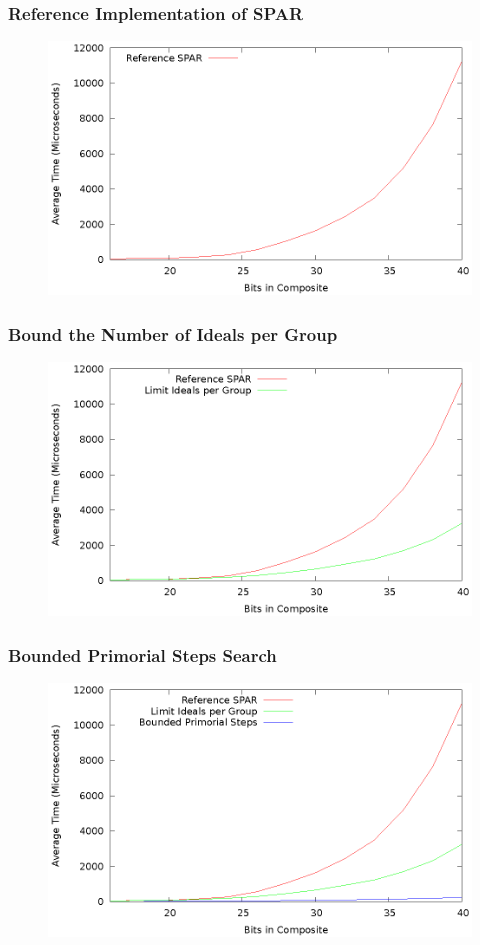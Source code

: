 \documentclass{beamer}
\begin{document}
\begin{frame}
\frametitle{Reference Implementation of SPAR}
\begin{figure}
\includegraphics[scale=0.86]{spar-vanilla}
\end{figure}
\end{frame}
\begin{frame}
\frametitle{Bound the Number of Ideals per Group}
\begin{figure}
\includegraphics[scale=0.86]{spar-bound-attempts}
\end{figure}
\end{frame}
\begin{frame}
\frametitle{Bounded Primorial Steps Search}
\begin{figure}
\includegraphics[scale=0.86]{spar-to-sspar}
\end{figure}
\end{frame}
\end{document}
